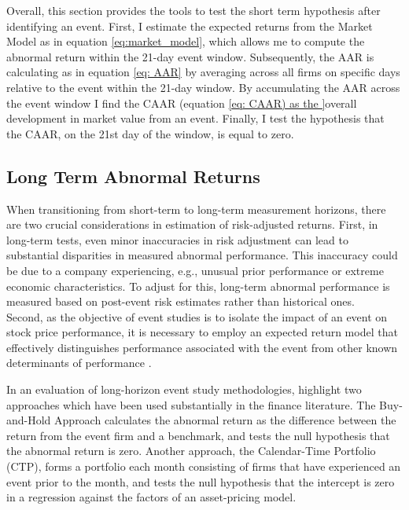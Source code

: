 Overall, this section provides the tools to test the short term hypothesis after identifying an event. First, I estimate the expected returns from the Market Model as in equation \ref{eq:market_model}, which allows me to compute the abnormal return within the 21-day event window. Subsequently, the AAR is calculating as in equation \ref{eq: AAR} by averaging across all firms on specific days relative to the event within the 21-day window. By accumulating the AAR across the event window I find the CAAR (equation \ref{eq: CAAR) as the }overall development in market value from an event. Finally, I test the hypothesis that the CAAR, on the 21st day of the window, is equal to zero.       

\subsection{Long Term Abnormal Returns}

When transitioning from short-term to long-term measurement horizons, there are two crucial considerations in estimation of risk-adjusted returns. First, in long-term tests, even minor inaccuracies in risk adjustment can lead to substantial disparities in measured abnormal performance. This inaccuracy could be due to a company experiencing, e.g., unusual prior performance or extreme economic characteristics. To adjust for this, long-term abnormal performance is measured based on post-event risk estimates rather than historical ones. \\
Second, as the objective of event studies is to isolate the impact of an event on stock price performance, it is necessary to employ an expected return model that effectively distinguishes performance associated with the event from other known determinants of performance \cite{kothari}.   

In an evaluation of long-horizon event study methodologies, \cite{Ang_event_method} highlight two approaches which have been used substantially in the finance literature. The Buy-and-Hold Approach calculates the abnormal return as the difference between the return from the event firm and a benchmark, and tests the null hypothesis that the abnormal return is zero. Another approach, the Calendar-Time Portfolio (CTP), forms a portfolio each month consisting of firms that have experienced an event prior to the month, and tests the null hypothesis that the intercept is zero in a regression against the factors of an asset-pricing model.

